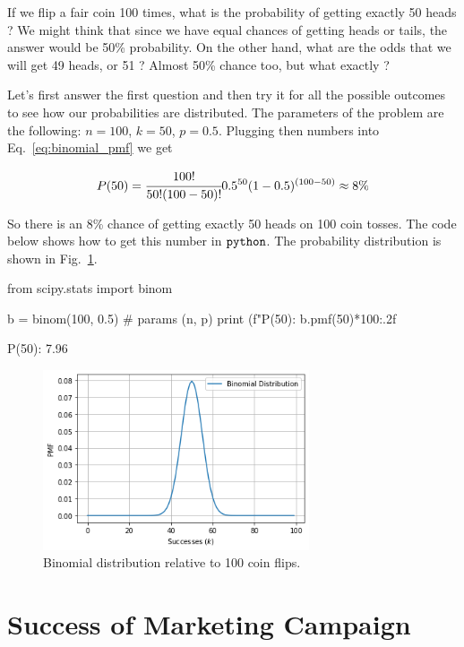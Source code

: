 If we flip a fair coin 100 times, what is the probability of getting exactly 50 heads ? 
We might think that since we have equal chances
of getting heads or tails, the answer would be 50\% probability. On the other hand, what are the odds that we will get 49 heads, or 51 ? Almost 50\% chance too, but what exactly ? 

Let's first answer the first question and then try it for all the possible outcomes to see how our probabilities are distributed. The parameters of the problem are the following: \(n = 100\), \(k = 50\), \(p = 0.5\). Plugging then numbers into Eq.~\ref{eq:binomial_pmf} we get

\[P(50) = \cfrac{100!}{50!(100 - 50)!}0.5^{50}(1-0.5)^{(100-50)} \approx 8\% \]

So there is an 8\% chance of getting exactly 50 heads on 100 coin tosses. The code below shows how to get this number in \(\tt{python}\). The probability distribution is shown in Fig.~\ref{fig:binomial_coin_flip}.

\begin{ipython}
from scipy.stats import binom

b = binom(100, 0.5) # params (n, p)
print (f"P(50): {b.pmf(50)*100:.2f}%

P(50): 7.96%
\end{ipython}

\begin{figure}[ht]
\centering
    \includegraphics[width=0.7\textwidth]{figures/binomial_2_0.png}
    \caption{Binomial distribution relative to 100 coin flips.}
    \label{fig:binomial_coin_flip}
\end{figure}
    
\section{Success of Marketing Campaign}\label{success-of-marketing-campaign}

